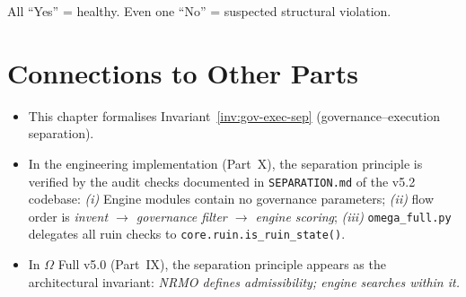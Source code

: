 \noindent
All ``Yes'' = healthy. Even one ``No'' = suspected structural
violation.

\section*{Connections to Other Parts}

\begin{itemize}
\item This chapter formalises Invariant~\ref{inv:gov-exec-sep}
(governance--execution separation).
\item In the engineering implementation (Part~X), the separation
principle is verified by the audit checks documented in
\texttt{SEPARATION.md} of the v5.2 codebase: \emph{(i)} Engine
modules contain no governance parameters; \emph{(ii)} flow order is
\emph{invent $\to$ governance filter $\to$ engine scoring};
\emph{(iii)} \texttt{omega\_full.py} delegates all ruin checks to
\texttt{core.ruin.is\_ruin\_state()}.
\item In $\Omega$ Full v5.0 (Part~IX), the separation principle
appears as the architectural invariant: \emph{NRMO defines
admissibility; engine searches within it.}
\end{itemize}
